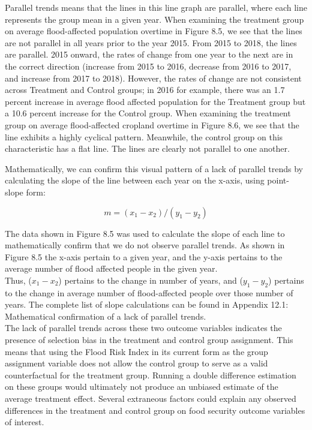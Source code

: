 Parallel trends means that the lines in this line graph are parallel, where each line represents the group mean in a given year. When examining the treatment group on average flood-affected population overtime in Figure 8.5, we see that the lines are not parallel in all years prior to the year 2015. From 2015 to 2018, the lines are parallel. 2015 onward, the rates of change from one year to the next are in the correct direction (increase from 2015 to 2016, decrease from 2016 to 2017, and increase from 2017 to 2018). However, the rates of change are not consistent across Treatment and Control groups; in 2016 for example, there was an 1.7 percent increase in average flood affected population for the Treatment group but a 10.6 percent increase for the Control group. When examining the treatment group on average flood-affected cropland overtime in Figure 8.6, we see that the line exhibits a highly cyclical pattern. Meanwhile, the control group on this characteristic has a flat line. The lines are clearly not parallel to one another.

Mathematically, we can confirm this visual pattern of a lack of parallel trends by calculating the slope of the line between each year on the x-axis, using point-slope form:

\[ {m} = ({x_1 - x_2}) / ({y_1 - y_2}) \]

The data shown in Figure 8.5 was used to calculate the slope of each line to mathematically confirm that we do not observe parallel trends. As shown in Figure 8.5 the x-axis pertain to a given year, and the y-axis pertains to the average number of flood affected people in the given year. \\

Thus, (\({x_1 - x_2}\)) pertains to the change in number of years, and (\({y_1 - y_2}\)) pertains to the change in average number of flood-affected people over those number of years. The complete list of slope calculations can be found in Appendix 12.1: Mathematical confirmation of a lack of parallel trends. \\

The lack of parallel trends across these two outcome variables indicates the presence of selection bias in the treatment and control group assignment. This means that using the Flood Risk Index in its current form as the group assignment variable does not allow the control group to serve as a valid counterfactual for the treatment group. Running a double difference estimation on these groups would ultimately not produce an unbiased estimate of the average treatment effect. Several extraneous factors could explain any observed differences in the treatment and control group on food security outcome variables of interest.

